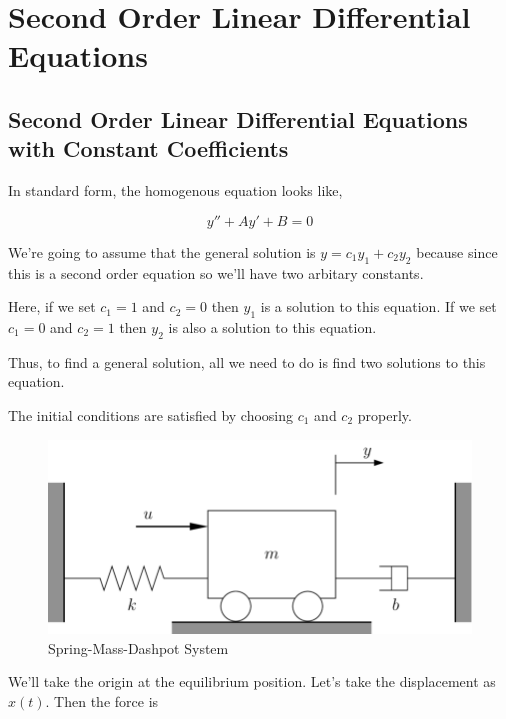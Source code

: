 

\chapter{Second Order Linear Differential Equations} 

\bigbreak

\section{Second Order Linear Differential Equations with Constant Coefficients}

In standard form, the homogenous equation looks like,

$$ y'' + Ay' + B = 0 $$

We're going to assume that the general solution is $ y = c_1 y_1 + c_2 y_2 $ 
because since this is a second order equation so we'll have two arbitary constants.

Here, if we set $c_1 = 1$ and $c_2 = 0$ then $y_1$ is a solution to this equation.
If we set $c_1 = 0$ and $c_2 = 1$ then $y_2$ is also a solution to this equation.

Thus, to find a general solution, all we need to do is find two solutions to this equation.

The initial conditions are satisfied by choosing $c_1$ and $c_2$ properly.

\begin{figure}[ht!]
	\centering
	\includegraphics[scale=0.3]{./images/lecture_9_figure_1.png}
	\caption{Spring-Mass-Dashpot System}
\end{figure}

We'll take the origin at the equilibrium position.
Let's take the displacement as $x(t)$. Then the force is 

